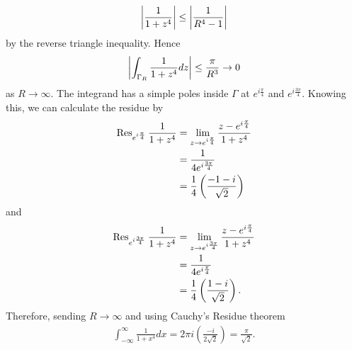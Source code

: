 \documentclass[a4paper,12pt]{article} %
\theoremstyle{plain}
\theoremstyle{definition}
\begin{document}
\begin{enumerate}
  \begin{align*}
    \abs{\frac{1}{1+z^{4}}} \le  \abs{\frac{1}{R^{4} - 1}}
  \end{align*}
  by the reverse triangle inequality.  Hence
  \begin{align*}
    \abs{\int_{\Gamma_R} \frac{1}{1+z^{4}}dz} \le \frac{\pi}{R^3} \to 0 
  \end{align*}
  as $R \to \infty$. The integrand has a simple poles inside $\Gamma$ at $e^{i \frac{\pi}{4}}$ and $e^{i\frac{3\pi}{4}}$.  Knowing this, we can calculate the residue by
  \begin{align*}
    \Res_{e^{i \frac{\pi}{4}}}\frac{1}{1+z^{4}} &= \lim_{z \to e^{i \frac{\pi}{4}}} \frac{z - e^{i \frac{\pi}{4}}}{1 + z^{4}}\\
                                                &= \frac{1}{4e^{i \frac{3\pi}{4}}} \\
                                                &= \frac{1}{4} \left(\frac{-1- i}{\sqrt{2}} \right) 
  \end{align*}
  and
  \begin{align*}
    \Res_{e^{i \frac{3\pi}{4}}}\frac{1}{1+z^{4}} &= \lim_{z \to e^{i \frac{3\pi}{4}}} \frac{z - e^{i \frac{\pi}{4}}}{1 + z^{4}}\\
                                                 &= \frac{1}{4 e^{i \frac{\pi}{4}}} \\
                                                 &= \frac{1}{4}\left(\frac{1 -i}{\sqrt{2}}\right).
  \end{align*}
  Therefore, sending $R \to \infty$ and using Cauchy's Residue theorem 
  \begin{align*}
    \int_{-\infty}^{\infty} \frac{1}{1+x^{4}}dx = 2 \pi i \left(\frac{-i}{2\sqrt{2}}\right) = \frac{\pi}{\sqrt{2}}. 
  \end{align*}

\end{enumerate}
\end{document}
